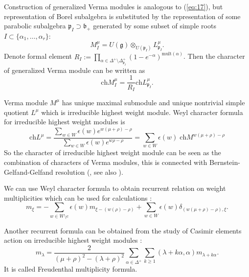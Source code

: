 \documentclass[preprint,12pt]{elsarticle}
\newcommand{\gf}{\mathfrak{g}}
\newcommand{\bff}{\mathfrak{b}}
\newcommand{\pf}{\mathfrak{p}}
\begin{document}
Construction of generalized Verma modules is analogous to (\ref{eq:17}), but representation of Borel subalgebra is substituted by the representation of some parabolic subalgebra $\pf_{I}\supset \bff_{+}$ generated by some subset of simple roots $I\subset \{\alpha_{1},\dots, \alpha_{r}\}$:
\begin{equation*}
M_{I}^{\mu}=U\left( \gf\right)\otimes _{U\left( \pf_{I}\right) }L_{\pf_{I}}^{\mu}.
\end{equation*}
Denote formal element $R_{I}:=\prod_{\alpha \in
\Delta ^{+}\setminus \Delta _{\pf_{I}}^{+}}\left( 1-e^{-\alpha
}\right) ^{\mathrm{mult}(\alpha )}$. Then the character of generalized Verma module can be written as
\begin{equation}
  \label{eq:18}
  \mathrm{ch}M_{I}^{\mu}=\frac{1}{R_{I}}\mathrm{ch}L_{\pf_{I}}^{\mu }.
\end{equation}

Verma module $M^{\mu}$ has unique maximal submodule and unique nontrivial simple quotient $L^{\mu}$ which is irreducible highest weight module. 
Weyl character formula for irreducible highest weight modules is
\begin{equation}
  \label{eq:13}
  \mathrm{ch} L^{\mu}=\frac{\sum_{w\in W} \epsilon(w) e^{w(\mu+\rho)-\rho}}{\sum_{w\in W}\epsilon(w) e^{w\rho-\rho}}=\sum_{w\in W} \epsilon(w)\; \mathrm{ch} M^{w(\mu+\rho)-\rho}
\end{equation}
So the character of irreducible highest weight module can be seen as the combination of characters of Verma modules, this is connected with Bernstein-Gelfand-Gelfand resolution (\cite{bernstein1976category,bernstein1971structure}, see also \cite{humphreys2008representations}). 


We can use Weyl character formula to obtain recurrent relation on weight multiplicities which can be used for calculations \cite{il2010folded,kulish4sfa}:
\begin{equation}
\label{eq:14}
m_{\xi }=-\sum_{w\in W\setminus e}\epsilon (w)m_{\xi
-\left( w(\rho )-\rho \right) }+\sum_{w\in W}\epsilon
(w)\delta _{\left( w(\mu +\rho )-\rho \right) ,\xi }.  
\end{equation}

Another recurrent formula can be obtained from the study of Casimir elements action on irreducible highest weight modules \cite{humphreys1997introduction}:
\begin{equation}
  \label{eq:15}
  m_{\lambda}=\frac{2}{(\mu+\rho)^{2}-(\lambda+\rho)^{2}}\sum_{\alpha\in \Delta^{+}}\sum_{k\geq 1} (\lambda+k\alpha,\alpha)m_{\lambda+k\alpha}.
\end{equation}
It is called Freudenthal multiplicity formula. 
\end{document}
